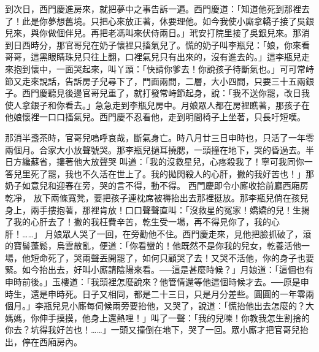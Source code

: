 \begin{showcontents}{}
到次日，西門慶進房來，就把夢中之事告訴一遍。西門慶道：「知道他死到那裡去了！此是你夢想舊境。只把心來放正著，休要理他。如今我使小廝拿轎子接了吳銀兒來，與你做個伴兒。再把老馮叫來伏侍兩日。」玳安打院里接了吳銀兒來。那消到日西時分，那官哥兒在奶子懷裡只搐氣兒了。慌的奶子叫李瓶兒：「娘，你來看哥哥，這黑眼睛珠兒只往上翻，口裡氣兒只有出來的，沒有進去的。」這李瓶兒走來抱到懷中，一面哭起來，叫丫頭：「快請你爹去！你說孩子待斷氣也。」可可常峙節又走來說話，告訴房子兒尋下了，門面兩間，二層，大小四間，只要三十五兩銀子。西門慶聽見後邊官哥兒重了，就打發常峙節起身，說：「我不送你罷，改日我使人拿銀子和你看去。」急急走到李瓶兒房中。月娘眾人都在房裡瞧著，那孩子在他娘懷裡一口口搐氣兒。西門慶不忍看他，走到明間椅子上坐著，只長吁短嘆。

那消半盞茶時，官哥兒嗚呼哀哉，斷氣身亡。時八月廿三日申時也，只活了一年零兩個月。合家大小放聲號哭。那李瓶兒撾耳撓腮，一頭撞在地下，哭的昏過去。半日方纔蘇省，摟著他大放聲哭 %
叫道：「我的沒救星兒，心疼殺我了！寧可我同你一答兒里死了罷，我也不久活在世上了。我的拋閃殺人的心肝，撇的我好苦也！」那奶子如意兒和迎春在旁，哭的言不得，動不得。
西門慶即令小廝收拾前廳西廂房乾凈，
放下兩條寬凳，要把孩子連枕席被褥抬出去那裡挺放。那李瓶兒倘在孩兒身上，兩手摟抱著，那裡肯放！口口聲聲直叫：「沒救星的冤家！嬌嬌的兒！生揭了我的心肝去了！撇的我枉費辛苦，乾生受一場，再不得見你了，我的心肝！……」 月娘眾人哭了一回，在旁勸他不住。西門慶走來，見他把臉抓破了，滾的寶髻蓬鬆，烏雲散亂，便道：「你看蠻的！他既然不是你我的兒女，乾養活他一場，他短命死了，哭兩聲丟開罷了，如何只顧哭了去！又哭不活他，你的身子也要緊。如今抬出去，好叫小廝請陰陽來看。──這是甚麼時候？」月娘道：「這個也有申時前後。」玉樓道：「我頭裡怎麼說來？他管情還等他這個時候才去。──原是申時生，還是申時死。日子又相同，都是二十三日，只是月分差些。圓圓的一年零兩個月。」李瓶兒見小廝每伺候兩旁要抬他，又哭了，說道：「慌抬他出去怎麼的？大媽媽，你伸手摸摸，他身上還熱哩！」叫了一聲：「我的兒嚛！你教我怎生割捨的你去？坑得我好苦也！……」一頭又撞倒在地下，哭了一回。眾小廝才把官哥兒抬出，停在西廂房內。


\end{showcontents}
